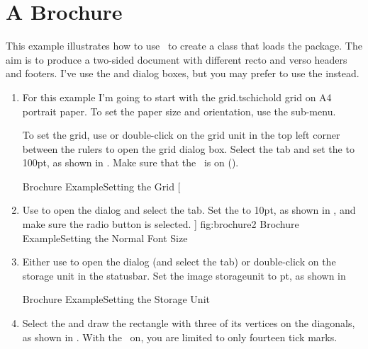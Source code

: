 \section{A Brochure}\label{sec:brochure}

This example illustrates how to use \FlowframTk\ to create a
class that loads the  package. The aim is to
produce a two-sided document with different \gls{recto} and
\gls{verso} headers and footers.
I've use the  and  dialog boxes,
but you may prefer to use the  instead.

\begin{enumerate}
\item For this example I'm going to start with the
\gls{grid.tschichold} grid on A4 portrait paper.  
To set the paper size and orientation, use the 
sub-menu.

To set the grid, use  or double-click
on the grid unit in the top left corner between the \glspl{ruler} to
open the \gls{grid} dialog box. Select the 
tab and set the  to 100\gls{pt}, as shown in
. Make sure that the \gridlock\ is on
().

{}
{Brochure Example\dash Setting the Grid}
[
    \item Use  to open the
 dialog and select the
 tab. Set the
 to 10\gls{pt}, as shown in
, and make sure the
 radio button is selected.
]
{fig:brochure2}
{}
{Brochure Example\dash Setting the Normal Font Size}

\item Either use  to open the
 dialog (and select the  tab) 
or double-click on the storage unit in the \gls{statusbar}.
Set the image \gls{storageunit} to \gls{pt}, as shown in

{}
{Brochure Example\dash Setting the Storage Unit}

\item Select the  and draw the rectangle
with three of its vertices on the diagonals, as shown in
. With the \gridlock\ on, you are limited to
only fourteen tick marks.


\end{enumerate}
